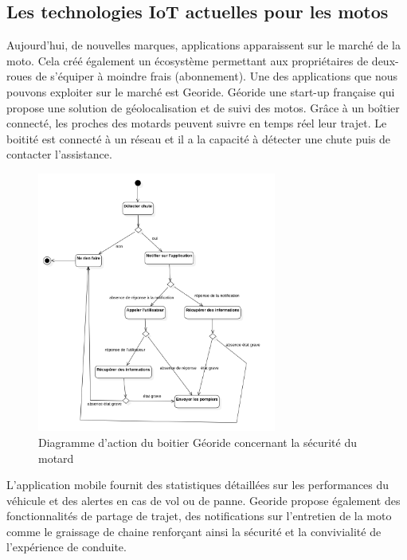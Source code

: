 \documentclass{article}
\begin{document}
\subsection{Les technologies IoT actuelles pour les motos}
Aujourd'hui, de nouvelles marques, applications\cite{iot_accessoire_moto} apparaissent sur le marché de la moto. Cela créé également un écosystème permettant aux propriétaires de deux-roues de s'équiper à moindre frais (abonnement). Une des applications que nous pouvons exploiter sur le marché est Georide. Géoride une start-up française qui propose une solution de géolocalisation et de suivi des motos. Grâce à un boîtier connecté, les proches des motards peuvent suivre en temps réel leur trajet. Le boitité est connecté à un réseau et il a la capacité à détecter une chute puis de contacter l'assistance. 
\begin{figure}[H]
    \centering
    \includegraphics[width=0.7\textwidth]{images/diag_etat_georide.png} 
    \caption{Diagramme d'action du boitier Géoride concernant la sécurité du motard}
\end{figure}
L’application mobile fournit des statistiques détaillées sur les performances du véhicule et des alertes en cas de vol ou de panne. Georide propose également des fonctionnalités de partage de trajet, des notifications sur l'entretien de la moto comme le graissage de chaine renforçant ainsi la sécurité et la convivialité de l’expérience de conduite.
\end{document}
